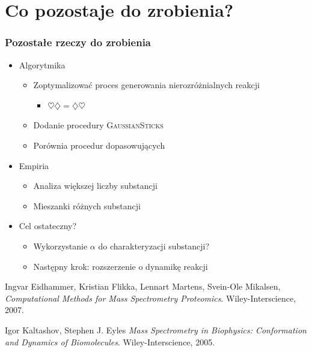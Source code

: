 \documentclass[xetex]{beamer}
\begin{document}
\section[Plany]{Co pozostaje do zrobienia?}

	\begin{frame}\frametitle{Pozostałe rzeczy do zrobienia}
		\begin{itemize}
			\item Algorytmika
			\begin{itemize}
				\item 	Zoptymalizować proces generowania nierozróżnialnych reakcji
				\begin{itemize}
					\item $\heartsuit \diamondsuit = \diamondsuit \heartsuit$
				\end{itemize}
				\item 	Dodanie procedury \textsc{GaussianSticks}
				\item 	Porównia procedur dopasowujących 
			\end{itemize}
			\item  	Empiria
			\begin{itemize}
				\item 	Analiza większej liczby substancji
				\item 	Mieszanki różnych substancji
			\end{itemize}
			\item 	Cel ostateczny?
			\begin{itemize}
				\item 	Wykorzystanie $\alpha$ do charakteryzacji substancji?
				\item 	Następny krok: rozszerzenie o dynamikę reakcji
			\end{itemize}
		\end{itemize}
	\end{frame}


	
	    
	\begin{thebibliography}{10}

		\beamertemplatebookbibitems
		
			Ingvar Eidhammer, Kristian Flikka, Lennart Martens, Svein-Ole Mikalsen,
			\emph{Computational Methods for Mass Spectrometry Proteomics}.
			Wiley-Interscience, 
			2007.
			
			Igor Kaltashov, Stephen J. Eyles
			\emph{Mass Spectrometry in Biophysics: Conformation and Dynamics of Biomolecules}.
			Wiley-Interscience, 
			2005.	
				
	\end{thebibliography}	



\end{document}
